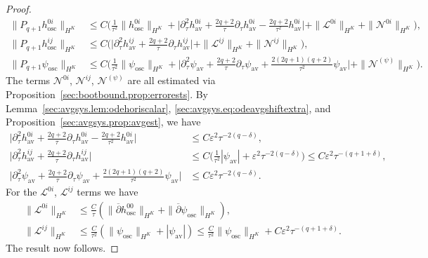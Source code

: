\documentclass{article}
\newcommand{\osc}{\mathrm{osc}}
\newcommand{\av}{\mathrm{av}}
\newcommand{\mc}{\mathcal}
\newcommand{\ol}{\overline}
\newcommand{\ve}{\varepsilon}
\newcommand{\pa}{\partial}
\begin{document}
\begin{proof}
    \begin{subequations}
    \begin{align}
        \|P_{q+1}h_{\osc}^{0i}\|_{H^K} &\leq C \Big(\frac{1}{\tau^2}\|h_{\osc}^{0i}\|_{H^K} + \Big|\pa_\tau^2 h_{\av}^{0i} + \frac{2q+2}{\tau}\pa_\tau h_{\av}^{0i} - \frac{2q+2}{\tau^2}h_{\av}^{0i}\Big|+\|\mc{L}^{0i}\|_{H^K}+\|\mc{N}^{0i}\|_{H^K}\Big),\\
        \|P_{q+1}h_{\osc}^{ij}\|_{H^K} &\leq C\Big(\Big|\pa_\tau^2 h_{\av}^{ij} + \frac{2q+2}{\tau}\pa_\tau h_{\av}^{ij}\Big|+\|\mc{L}^{ij}\|_{H^K}+\|\mc{N}^{ij}\|_{H^K}\Big),\\
        \|P_{q+1}\psi_{\osc}\|_{H^K} &\leq C\Big( \frac{1}{\tau^2}\|\psi_{\osc}\|_{H^K} + \Big|\pa_\tau^2 \psi_{\av} + \frac{2q+2}{\tau}\pa_\tau \psi_{\av} + \frac{2(2q+1)(q+2)}{\tau^2}\psi_{\av}\Big|+\|\mc{N}^{(\psi)}\|_{H^K}\Big).
        \end{align}
    \end{subequations}
    The terms $\mc{N}^{0i}$, $\mc{N}^{ij}$, $\mc{N}^{(\psi)}$ are all estimated via Proposition~\ref{sec:bootbound.prop:errorests}. By Lemma~\ref{sec:avgsys.lem:odehoriscalar}, \eqref{sec:avgsys.eq:odeavgshiftextra}, and Proposition~\ref{sec:avgsys.prop:avgest}, we have
    \begin{subequations}
        \begin{align}
            \Big|\pa_\tau^2 h_{\av}^{0i} + \frac{2q+2}{\tau}\pa_\tau h_{\av}^{0i} - \frac{2q+2}{\tau^2}h_{\av}^{0i}\Big| &\leq C\ve^2\tau^{-2(q-\delta)},\\
            \Big|\pa_\tau^2 h_{\av}^{ij} + \frac{2q+2}{\tau}\pa_\tau h_{\av}^{ij}\Big| &\leq C\Big(\frac{1}{\tau^2}|\psi_{\av}| + \ve^2\tau^{-2(q-\delta)}\Big) \leq C\ve^2\tau^{-(q+1+\delta)},\\
            \Big|\pa_\tau^2 \psi_{\av} + \frac{2q+2}{\tau}\pa_\tau \psi_{\av} + \frac{2(2q+1)(q+2)}{\tau^2}\psi_{\av}\Big| &\leq C\ve^2\tau^{-2(q-\delta)}.
        \end{align}
    \end{subequations}
    For the $\mc{L}^{0i}$, $\mc{L}^{ij}$ terms we have
    \begin{subequations}
        \begin{align}
            \|\mc{L}^{0i}\|_{H^K} &\leq \frac{C}{\tau}(\|\ol{\pa} h_{\osc}^{00}\|_{H^K} + \|\ol{\pa}\psi_{\osc}\|_{H^K}),\\
            \|\mc{L}^{ij}\|_{H^K} &\leq \frac{C}{\tau^2}(\|\psi_{\osc}\|_{H^K} + |\psi_{\av}|) \leq \frac{C}{\tau^2}\|\psi_{\osc}\|_{H^K} + C\ve^2\tau^{-(q+1+\delta)}.
        \end{align}
    \end{subequations}
    The result now follows.
\end{proof}
\end{document}
